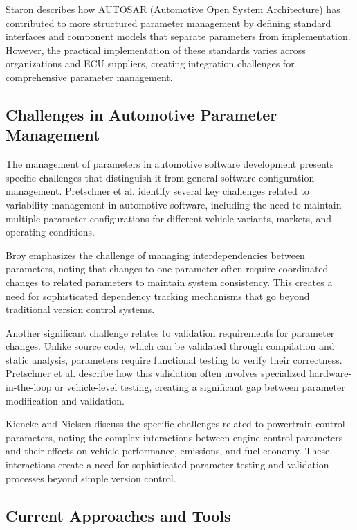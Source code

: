 Staron \cite{staron2021automotive} describes how AUTOSAR (Automotive Open System Architecture) has contributed to more structured parameter management by defining standard interfaces and component models that separate parameters from implementation. However, the practical implementation of these standards varies across organizations and ECU suppliers, creating integration challenges for comprehensive parameter management.

\subsection{Challenges in Automotive Parameter Management}
\label{subsec:challenges-parameter-management}

The management of parameters in automotive software development presents specific challenges that distinguish it from general software configuration management. Pretschner et al. \cite{pretschner2007software} identify several key challenges related to variability management in automotive software, including the need to maintain multiple parameter configurations for different vehicle variants, markets, and operating conditions.

Broy \cite{broy2006challenges} emphasizes the challenge of managing interdependencies between parameters, noting that changes to one parameter often require coordinated changes to related parameters to maintain system consistency. This creates a need for sophisticated dependency tracking mechanisms that go beyond traditional version control systems.

Another significant challenge relates to validation requirements for parameter changes. Unlike source code, which can be validated through compilation and static analysis, parameters require functional testing to verify their correctness. Pretschner et al. \cite{pretschner2007software} describe how this validation often involves specialized hardware-in-the-loop or vehicle-level testing, creating a significant gap between parameter modification and validation.

Kiencke and Nielsen \cite{kiencke2000automotive} discuss the specific challenges related to powertrain control parameters, noting the complex interactions between engine control parameters and their effects on vehicle performance, emissions, and fuel economy. These interactions create a need for sophisticated parameter testing and validation processes beyond simple version control.

\subsection{Current Approaches and Tools}
\label{subsec:current-approaches-tools}

